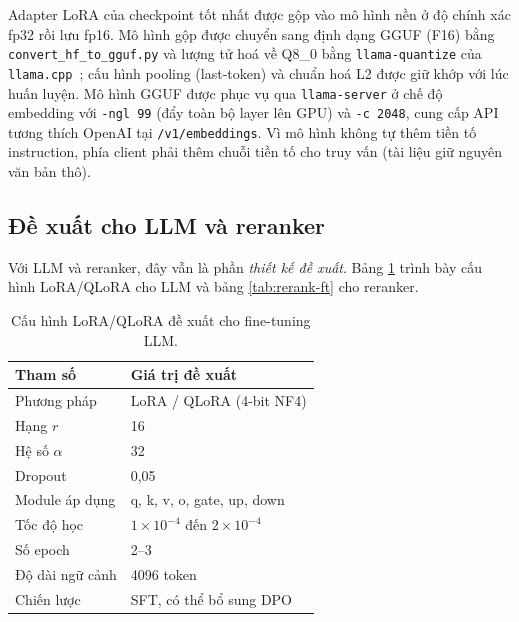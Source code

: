 Adapter LoRA của checkpoint tốt nhất được gộp vào mô hình nền ở độ chính xác fp32 rồi lưu
fp16. Mô hình gộp được chuyển sang định dạng GGUF (F16) bằng \texttt{convert\_hf\_to\_gguf.py}
và lượng tử hoá về Q8\_0 bằng \texttt{llama-quantize} của \texttt{llama.cpp}~\cite{llamacpp2024};
cấu hình pooling (last-token) và chuẩn hoá L2 được giữ khớp với lúc huấn luyện. Mô hình GGUF
được phục vụ qua \texttt{llama-server} ở chế độ embedding với \texttt{-ngl 99} (đẩy toàn bộ
layer lên GPU) và \texttt{-c 2048}, cung cấp API tương thích OpenAI tại \texttt{/v1/embeddings}.
Vì mô hình không tự thêm tiền tố instruction, phía client phải thêm chuỗi tiền tố cho truy vấn
(tài liệu giữ nguyên văn bản thô).

\subsection{Đề xuất cho LLM và reranker}

Với LLM và reranker, đây vẫn là phần \emph{thiết kế đề xuất}. Bảng \ref{tab:lora} trình bày
cấu hình LoRA/QLoRA cho LLM và bảng \ref{tab:rerank-ft} cho reranker.

\begin{table}[htbp]
\centering
\caption{Cấu hình LoRA/QLoRA đề xuất cho fine-tuning LLM.}
\label{tab:lora}
\small
\begin{tabular}{@{}p{6.4cm}p{8cm}@{}}
\toprule
\textbf{Tham số} & \textbf{Giá trị đề xuất} \\
\midrule
Phương pháp & LoRA / QLoRA (4-bit NF4) \\
Hạng $r$ & 16 \\
Hệ số $\alpha$ & 32 \\
Dropout & 0,05 \\
Module áp dụng & q, k, v, o, gate, up, down \\
Tốc độ học & $1\times10^{-4}$ đến $2\times10^{-4}$ \\
Số epoch & 2--3 \\
Độ dài ngữ cảnh & 4096 token \\
Chiến lược & SFT, có thể bổ sung DPO \\
\bottomrule
\end{tabular}
\end{table}

